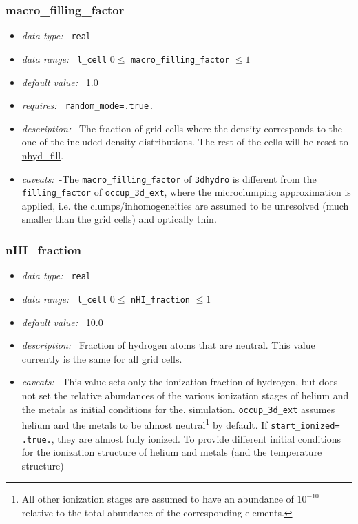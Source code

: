 \documentclass[a4paper,10pt]{article}
\begin{document}
\subsubsection{macro\_filling\_factor}
\label{hydopt:macrofillingfactor}
\begin{itemize}
 \item \textit{data type:~} \texttt{real}
 \item \textit{data range:~} \texttt{l\_cell} $0 \leq$ 
 \texttt{macro\_filling\_factor}
                             $\leq 1$
 \item \textit{default value:~} 1.0
 \item \textit{requires:~} 
  \hyperref[hydopt:randommode]{\texttt{random\_mode}}\texttt{=.true.}
 \item \textit{description:~} The fraction of grid cells where the density 
  corresponds to the one of the included density distributions. The rest of 
  the cells will be reset to \hyperref[hydopt:nhydfill]{nhyd\_fill}.
 \item \textit{caveats:~}-The \texttt{macro\_filling\_factor} of 
  \texttt{3dhydro} is different from the \texttt{filling\_factor}  of 
  \texttt{occup\_3d\_ext}, where the microclumping approximation is applied,
  i.e. the clumps/inhomogeneities are assumed to be unresolved (much smaller 
  than the grid cells) and optically thin.
\end{itemize}

\subsubsection{nHI\_fraction}
\label{hydopt:nhifraction}
\begin{itemize}
 \item \textit{data type:~} \texttt{real}
 \item \textit{data range:~} \texttt{l\_cell} $0 \leq$ \texttt{nHI\_fraction}
  $\leq 1$
 \item \textit{default value:~} 10.0
 \item \textit{description:~} Fraction of hydrogen atoms that are neutral. 
  This value currently is the same for all grid cells.
 \item \textit{caveats:~} This value sets only the ionization fraction of
  hydrogen, but does not set the relative abundances of the various 
  ionization stages of helium and the metals as initial conditions for the. 
  simulation. \texttt{occup\_3d\_ext} assumes helium and the metals to be 
  almost neutral\footnote{All other ionization stages are assumed to have an 
  abundance of $10^{-10}$ relative to the total abundance of the 
  corresponding elements.} by default. If 
  \hyperref[opt:startionized]{\texttt{start\_ionized}}\texttt{= .true.}, they 
  are almost fully ionized. To provide different initial conditions for the 
ionization structure of helium and metals (and the temperature structure)
\end{itemize}
\end{document}

